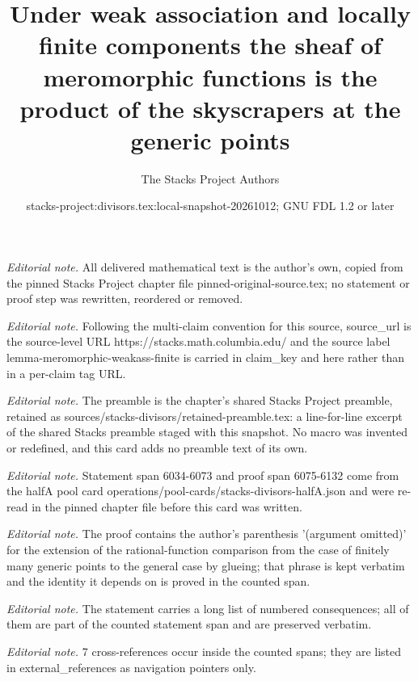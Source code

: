 \documentclass[10pt,a4paper]{amsart}
\title{Under weak association and locally finite components the sheaf of meromorphic functions is the product of the skyscrapers at the generic points}
\author{The Stacks Project Authors}
\date{stacks-project:divisors.tex:local-snapshot-20261012; GNU FDL 1.2 or later}
\theoremstyle{plain}
\theoremstyle{definition}
\theoremstyle{remark}
\numberwithin{equation}{subsection}
\begin{document}
\maketitle
\noindent\textit{Editorial note.} All delivered mathematical text is the author's own, copied from the pinned Stacks Project chapter file pinned-original-source.tex; no statement or proof step was rewritten, reordered or removed.\par\medskip
\noindent\textit{Editorial note.} Following the multi-claim convention for this source, source\_url is the source-level URL https://stacks.math.columbia.edu/ and the source label lemma-meromorphic-weakass-finite is carried in claim\_key and here rather than in a per-claim tag URL.\par\medskip
\noindent\textit{Editorial note.} The preamble is the chapter's shared Stacks Project preamble, retained as sources/stacks-divisors/retained-preamble.tex: a line-for-line excerpt of the shared Stacks preamble staged with this snapshot. No macro was invented or redefined, and this card adds no preamble text of its own.\par\medskip
\noindent\textit{Editorial note.} Statement span 6034-6073 and proof span 6075-6132 come from the halfA pool card operations/pool-cards/stacks-divisors-halfA.json and were re-read in the pinned chapter file before this card was written.\par\medskip
\noindent\textit{Editorial note.} The proof contains the author's parenthesis '(argument omitted)' for the extension of the rational-function comparison from the case of finitely many generic points to the general case by glueing; that phrase is kept verbatim and the identity it depends on is proved in the counted span.\par\medskip
\noindent\textit{Editorial note.} The statement carries a long list of numbered consequences; all of them are part of the counted statement span and are preserved verbatim.\par\medskip
\noindent\textit{Editorial note.} 7 cross-references occur inside the counted spans; they are listed in external\_references as navigation pointers only.\par\medskip
\end{document}
